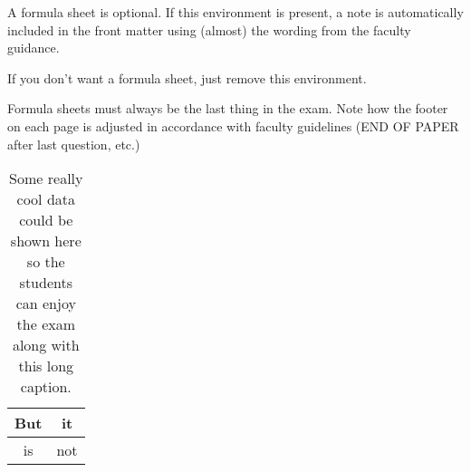 \documentclass[answers]{uosexam}
\begin{document}
\begin{formulasheet}
A formula sheet is optional. If this environment is present, a note is automatically included in the front matter
using (almost) the wording from the faculty guidance.

If you don't want a formula sheet, just remove this environment.

Formula sheets must always be the last thing in the exam. Note how the footer on each page is adjusted
in accordance with faculty guidelines (END OF PAPER after last question, etc.)

\begin{table}[htb]
\caption{Some really cool data could be shown here so the students can enjoy the exam along with this long caption.}
\begin{center}
\begin{tabular}{|c|c|}
\hline
But & it \\
\hline
is & not \\
\hline
\end{tabular}
\end{center}
\label{tab:mytable}
\end{table}

\end{formulasheet}
\end{document}
